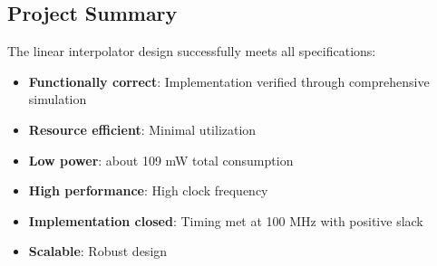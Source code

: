 \documentclass[a4paper,11pt]{article}
\begin{document}
\subsection{Project Summary}

The linear interpolator design successfully meets all specifications:
\begin{itemize}
    \item \textbf{Functionally correct}: Implementation verified through comprehensive simulation
    \item \textbf{Resource efficient}: Minimal utilization 
    \item \textbf{Low power}: about 109 mW total consumption
    \item \textbf{High performance}: High clock frequency 
    \item \textbf{Implementation closed}: Timing met at 100 MHz with positive slack
    \item \textbf{Scalable}: Robust design 
\end{itemize}
\end{document}
